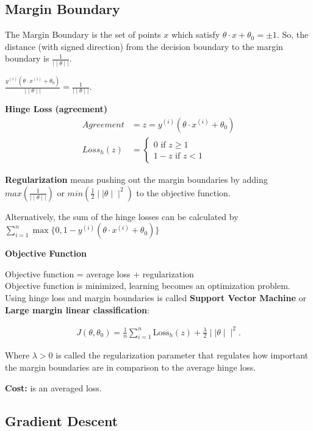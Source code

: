 \subsection{Margin Boundary}

The Margin Boundary is the set of points  $x$  which satisfy $\theta \cdot x + \theta _0= \pm 1$. So, the distance (with signed direction) from the decision boundary to the margin boundary is $\displaystyle \frac{1}{\mid \mid \theta \mid \mid }$.

$\frac{y^{(i)}(\theta \cdot x^{(i)} + \theta _0)}{\mid \mid \theta \mid \mid }=\frac{1}{\mid \mid \theta \mid \mid }.$

\textbf{Hinge Loss (agreement)}
\begin{align*}
Agreement &= z = y^{(i)}(\theta \cdot x^{(i)} + \theta _0)\\
Loss_h(z) &= 
\begin{cases}
		 0 \text{ if } z \geq 1\\
		 1-z \text{ if } z < 1
\end{cases} 
\end{align*}

\textbf{Regularization} means pushing out the margin boundaries by adding $max(\frac{1}{\mid \mid \theta \mid \mid })$ or $min(\frac{1}{2}\mid \mid \theta \mid \mid^2)$ to the objective function.

Alternatively, the sum of the hinge losses can be calculated by
$\sum _{i=1}^{n} \max \{ 0, 1 - y^{(i)} (\theta \cdot x^{(i)} + \theta _0)\}$

\textbf{Objective Function}

Objective function = average loss + regularization\\

Objective function is minimized, learning becomes an optimization problem. Using hinge loss and margin boundaries is called \textbf{Support Vector Machine} or \textbf{Large margin linear classification}:

\begin{align*}
J(\theta , \theta _0) = \frac{1}{n} \sum _{i=1}^{n} \text {Loss}_ h (z) + \frac{\lambda }{2} \mid \mid \theta \mid \mid ^2.
\end{align*}

Where $\lambda > 0$ is called the regularization parameter that regulates how important the margin boundaries are in comparison to the average hinge loss.

\textbf{Cost:} is an averaged loss.

\subsection{Gradient Descent}

